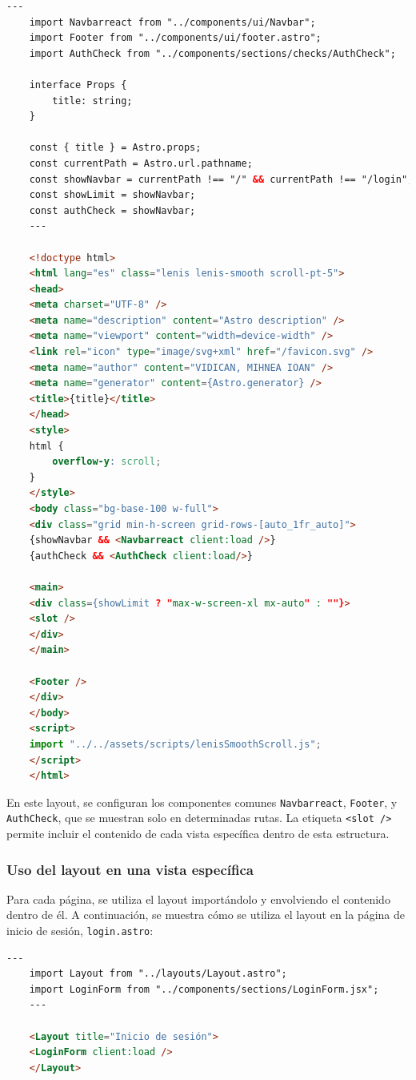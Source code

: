 \begin{lstlisting}[language=html, caption={Layout base en Astro}]
	---
	import Navbarreact from "../components/ui/Navbar";
	import Footer from "../components/ui/footer.astro";
	import AuthCheck from "../components/sections/checks/AuthCheck";
	
	interface Props {
		title: string;
	}
	
	const { title } = Astro.props;
	const currentPath = Astro.url.pathname;
	const showNavbar = currentPath !== "/" && currentPath !== "/login";
	const showLimit = showNavbar;
	const authCheck = showNavbar;
	---
	
	<!doctype html>
	<html lang="es" class="lenis lenis-smooth scroll-pt-5">
	<head>
	<meta charset="UTF-8" />
	<meta name="description" content="Astro description" />
	<meta name="viewport" content="width=device-width" />
	<link rel="icon" type="image/svg+xml" href="/favicon.svg" />
	<meta name="author" content="VIDICAN, MIHNEA IOAN" />
	<meta name="generator" content={Astro.generator} />
	<title>{title}</title>
	</head>
	<style>
	html {
		overflow-y: scroll;
	}
	</style>
	<body class="bg-base-100 w-full">
	<div class="grid min-h-screen grid-rows-[auto_1fr_auto]">
	{showNavbar && <Navbarreact client:load />}
	{authCheck && <AuthCheck client:load/>}
	
	<main>
	<div class={showLimit ? "max-w-screen-xl mx-auto" : ""}>
	<slot />
	</div>
	</main>
	
	<Footer />
	</div>
	</body>
	<script>
	import "../../assets/scripts/lenisSmoothScroll.js";
	</script>
	</html>
\end{lstlisting}

En este layout, se configuran los componentes comunes \texttt{Navbarreact}, \texttt{Footer}, y \texttt{AuthCheck}, que se muestran solo en determinadas rutas. La etiqueta \texttt{<slot />} permite incluir el contenido de cada vista específica dentro de esta estructura.

\subsubsection{Uso del layout en una vista específica}

Para cada página, se utiliza el layout importándolo y envolviendo el contenido dentro de él. A continuación, se muestra cómo se utiliza el layout en la página de inicio de sesión, \texttt{login.astro}:

\begin{lstlisting}[language=html, caption={Uso del Layout en login.astro}]
	---
	import Layout from "../layouts/Layout.astro";
	import LoginForm from "../components/sections/LoginForm.jsx";
	---
	
	<Layout title="Inicio de sesión">
	<LoginForm client:load />
	</Layout>
\end{lstlisting}

